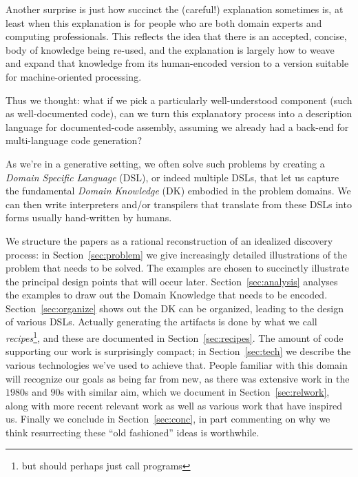 \documentclass[english,submission]{programming}
\begin{document}
Another surprise is just how succinct the (careful!) explanation sometimes is, at
least when this explanation is for people who are both domain experts and computing
professionals. This reflects the idea that there is an accepted, concise, body of
knowledge being re-used, and the explanation is largely how to weave and expand that
knowledge from its human-encoded version to a version suitable for machine-oriented
processing.

Thus we thought: what if we pick a particularly well-understood component (such as
well-documented code), can we turn this explanatory process into a description
language for documented-code assembly, assuming we already had a back-end for
multi-language code generation?

As we're in a generative setting, we often solve such problems by creating a
\emph{Domain Specific Language} (DSL), or indeed multiple DSLs, that let us
capture the fundamental \emph{Domain Knowledge} (DK) embodied in the problem domains.
We can then write interpreters and/or transpilers that translate from these DSLs
into forms usually hand-written by humans.

We structure the papers as a rational reconstruction of an idealized discovery
process: in Section~\ref{sec:problem} we give increasingly detailed illustrations
of the problem that needs to be solved. The examples are chosen to succinctly
illustrate the principal design points that will occur later. Section~\ref{sec:analysis}
analyses the examples to draw out the Domain Knowledge that needs to be encoded.
Section~\ref{sec:organize} shows out the DK can be organized, leading to the design
of various DSLs. Actually generating the artifacts is done by what we call
\emph{recipes}\footnote{but should perhaps just call programs}, and these are documented
in Section~\ref{sec:recipes}. The amount of code supporting our work is surprisingly
compact; in Section~\ref{sec:tech} we describe the various technologies we've used
to achieve that. People familiar with this domain will recognize our goals as being
far from new, as there was extensive work in the $1980$s and $90$s with similar aim,
which we document in Section~\ref{sec:relwork}, along with more recent relevant work
as well as various work that have inspired us. Finally we conclude in Section~\ref{sec:conc},
in part commenting on why we think resurrecting these ``old fashioned'' ideas is
worthwhile.
\end{document}
